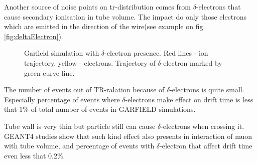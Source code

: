 \documentclass[]{article}
\begin{document}
	Another source of noise points on tr-distribution comes from $\delta$-electrons that cause secondary ionisation in tube volume. The impact do only those electrons which are emitted in the direction of the wire(see example on fig.\ref{fig:deltaElectron}).
	
	\begin{figure}[h!]
		\centering
		\qquad
		\caption{Garfield simulation with $\delta$-electron presence. Red lines - ion trajectory, yellow - electrons. Trajectory of $\delta$-electron marked by green curve line.}			
	\end{figure}	
	
	The number of events out of TR-ralation because of $\delta$-electrons is quite small. Especially percentage of events where $\delta$-electrons make effect on drift time is less that $1\%$ of total number of events  in GARFIELD simulations. 
	
	Tube wall is very thin but particle still can cause $\delta$-electrons when crossing it. GEANT4 studies show that such kind effect also presents in interaction of muon with tube volume, and percentage of events with $\delta$-electron that affect drift time even less that $0.2\%$.
	
\end{document}
